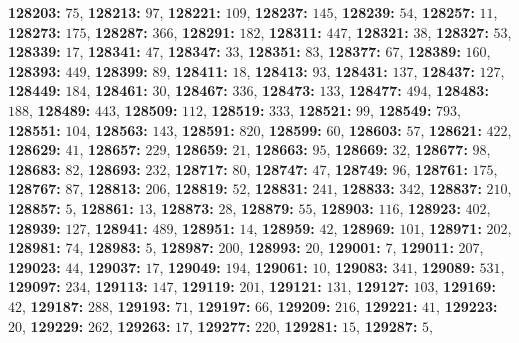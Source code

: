 \textsf{\bfseries 128203:} $75$, \textsf{\bfseries 128213:} $97$, \textsf{\bfseries 128221:} $109$, \textsf{\bfseries 128237:} $145$, \textsf{\bfseries 128239:} $54$, \textsf{\bfseries 128257:} $11$, \textsf{\bfseries 128273:} $175$, \textsf{\bfseries 128287:} $366$, \textsf{\bfseries 128291:} $182$, \textsf{\bfseries 128311:} $447$, \textsf{\bfseries 128321:} $38$, \textsf{\bfseries 128327:} $53$, \textsf{\bfseries 128339:} $17$, \textsf{\bfseries 128341:} $47$, \textsf{\bfseries 128347:} $33$, \textsf{\bfseries 128351:} $83$, \textsf{\bfseries 128377:} $67$, \textsf{\bfseries 128389:} $160$, \textsf{\bfseries 128393:} $449$, \textsf{\bfseries 128399:} $89$, \textsf{\bfseries 128411:} $18$, \textsf{\bfseries 128413:} $93$, \textsf{\bfseries 128431:} $137$, \textsf{\bfseries 128437:} $127$, \textsf{\bfseries 128449:} $184$, \textsf{\bfseries 128461:} $30$, \textsf{\bfseries 128467:} $336$, \textsf{\bfseries 128473:} $133$, \textsf{\bfseries 128477:} $494$, \textsf{\bfseries 128483:} $188$, \textsf{\bfseries 128489:} $443$, \textsf{\bfseries 128509:} $112$, \textsf{\bfseries 128519:} $333$, \textsf{\bfseries 128521:} $99$, \textsf{\bfseries 128549:} $793$, \textsf{\bfseries 128551:} $104$, \textsf{\bfseries 128563:} $143$, \textsf{\bfseries 128591:} $820$, \textsf{\bfseries 128599:} $60$, \textsf{\bfseries 128603:} $57$, \textsf{\bfseries 128621:} $422$, \textsf{\bfseries 128629:} $41$, \textsf{\bfseries 128657:} $229$, \textsf{\bfseries 128659:} $21$, \textsf{\bfseries 128663:} $95$, \textsf{\bfseries 128669:} $32$, \textsf{\bfseries 128677:} $98$, \textsf{\bfseries 128683:} $82$, \textsf{\bfseries 128693:} $232$, \textsf{\bfseries 128717:} $80$, \textsf{\bfseries 128747:} $47$, \textsf{\bfseries 128749:} $96$, \textsf{\bfseries 128761:} $175$, \textsf{\bfseries 128767:} $87$, \textsf{\bfseries 128813:} $206$, \textsf{\bfseries 128819:} $52$, \textsf{\bfseries 128831:} $241$, \textsf{\bfseries 128833:} $342$, \textsf{\bfseries 128837:} $210$, \textsf{\bfseries 128857:} $5$, \textsf{\bfseries 128861:} $13$, \textsf{\bfseries 128873:} $28$, \textsf{\bfseries 128879:} $55$, \textsf{\bfseries 128903:} $116$, \textsf{\bfseries 128923:} $402$, \textsf{\bfseries 128939:} $127$, \textsf{\bfseries 128941:} $489$, \textsf{\bfseries 128951:} $14$, \textsf{\bfseries 128959:} $42$, \textsf{\bfseries 128969:} $101$, \textsf{\bfseries 128971:} $202$, \textsf{\bfseries 128981:} $74$, \textsf{\bfseries 128983:} $5$, \textsf{\bfseries 128987:} $200$, \textsf{\bfseries 128993:} $20$, \textsf{\bfseries 129001:} $7$, \textsf{\bfseries 129011:} $207$, \textsf{\bfseries 129023:} $44$, \textsf{\bfseries 129037:} $17$, \textsf{\bfseries 129049:} $194$, \textsf{\bfseries 129061:} $10$, \textsf{\bfseries 129083:} $341$, \textsf{\bfseries 129089:} $531$, \textsf{\bfseries 129097:} $234$, \textsf{\bfseries 129113:} $147$, \textsf{\bfseries 129119:} $201$, \textsf{\bfseries 129121:} $131$, \textsf{\bfseries 129127:} $103$, \textsf{\bfseries 129169:} $42$, \textsf{\bfseries 129187:} $288$, \textsf{\bfseries 129193:} $71$, \textsf{\bfseries 129197:} $66$, \textsf{\bfseries 129209:} $216$, \textsf{\bfseries 129221:} $41$, \textsf{\bfseries 129223:} $20$, \textsf{\bfseries 129229:} $262$, \textsf{\bfseries 129263:} $17$, \textsf{\bfseries 129277:} $220$, \textsf{\bfseries 129281:} $15$, \textsf{\bfseries 129287:} $5$, 
